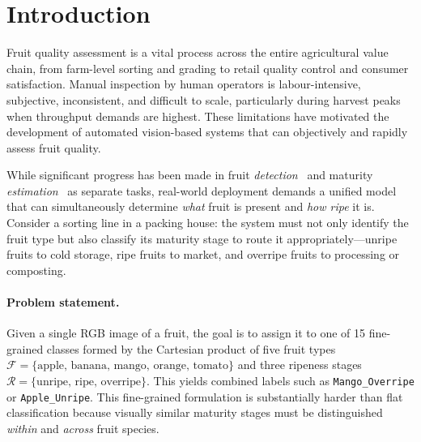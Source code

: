 \documentclass[10pt,twocolumn,letterpaper]{article}
\begin{document}
\section{Introduction}
\label{sec:intro}

Fruit quality assessment is a vital process across the entire agricultural value chain, from farm-level sorting and grading to retail quality control and consumer satisfaction.
Manual inspection by human operators is labour-intensive, subjective, inconsistent, and difficult to scale, particularly during harvest peaks when throughput demands are highest.
These limitations have motivated the development of automated vision-based systems that can objectively and rapidly assess fruit quality.

While significant progress has been made in fruit \emph{detection}~\cite{sa2016deepfruits} and maturity \emph{estimation}~\cite{rauf2019visual} as separate tasks, real-world deployment demands a unified model that can simultaneously determine \emph{what} fruit is present and \emph{how ripe} it is.
Consider a sorting line in a packing house: the system must not only identify the fruit type but also classify its maturity stage to route it appropriately---unripe fruits to cold storage, ripe fruits to market, and overripe fruits to processing or composting.

\paragraph{Problem statement.}
Given a single RGB image of a fruit, the goal is to assign it to one of 15 fine-grained classes formed by the Cartesian product of five fruit types $\mathcal{F} = \{\text{apple, banana, mango, orange, tomato}\}$ and three ripeness stages $\mathcal{R} = \{\text{unripe, ripe, overripe}\}$.
This yields combined labels such as \texttt{Mango\_Overripe} or \texttt{Apple\_Unripe}.
This fine-grained formulation is substantially harder than flat classification because visually similar maturity stages must be distinguished \emph{within} and \emph{across} fruit species.
\end{document}
